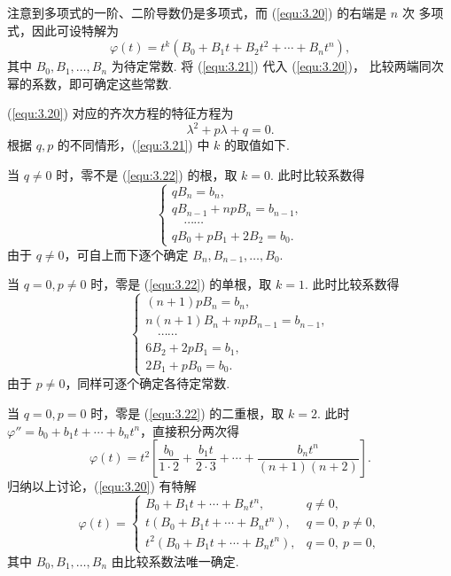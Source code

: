 注意到多项式的一阶、二阶导数仍是多项式，而 (\ref{equ:3.20}) 的右端是 $n$ 次
多项式，因此可设特解为
\begin{equation}\label{equ:3.21}
\varphi(t)=t^k\left(B_0+B_1t+B_2t^2+\cdots+B_nt^n\right),
\end{equation}
其中 $B_0,B_1,\dots,B_n$ 为待定常数. 将 (\ref{equ:3.21}) 代入 (\ref{equ:3.20})，
比较两端同次幂的系数，即可确定这些常数.

(\ref{equ:3.20}) 对应的齐次方程的特征方程为
\begin{equation}\label{equ:3.22}
\lambda^2+p\lambda+q=0.
\end{equation}
根据 $q,p$ 的不同情形，(\ref{equ:3.21}) 中 $k$ 的取值如下.

当 $q\neq0$ 时，零不是 (\ref{equ:3.22}) 的根，取 $k=0$. 此时比较系数得
\[
\begin{cases}
qB_n=b_n,\\
qB_{n-1}+npB_n=b_{n-1},\\
\quad\cdots\cdots\\
qB_0+pB_1+2B_2=b_0.
\end{cases}
\]
由于 $q\neq0$，可自上而下逐个确定 $B_n,B_{n-1},\dots,B_0$.

当 $q=0,p\neq0$ 时，零是 (\ref{equ:3.22}) 的单根，取 $k=1$. 此时比较系数得
\[
\begin{cases}
(n+1)pB_n=b_n,\\
n(n+1)B_n+npB_{n-1}=b_{n-1},\\
\quad\cdots\cdots\\
6B_2+2pB_1=b_1,\\
2B_1+pB_0=b_0.
\end{cases}
\]
由于 $p\neq0$，同样可逐个确定各待定常数.

当 $q=0,p=0$ 时，零是 (\ref{equ:3.22}) 的二重根，取 $k=2$. 此时
$\varphi''=b_0+b_1t+\cdots+b_nt^n$，直接积分两次得
\[
\varphi(t)=t^2\left[\frac{b_0}{1\cdot2}+\frac{b_1t}{2\cdot3}
+\cdots+\frac{b_nt^n}{(n+1)(n+2)}\right].
\]
归纳以上讨论，(\ref{equ:3.20}) 有特解
\[
\varphi(t)=
\begin{cases}
B_0+B_1t+\cdots+B_nt^n, & q\neq0,\\
t\left(B_0+B_1t+\cdots+B_nt^n\right), & q=0,\ p\neq0,\\
t^2\left(B_0+B_1t+\cdots+B_nt^n\right), & q=0,\ p=0,
\end{cases}
\]
其中 $B_0,B_1,\dots,B_n$ 由比较系数法唯一确定.

